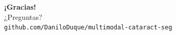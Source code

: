 \documentclass[aspectratio=169]{beamer}
\begin{document}
\begin{frame}{}
\centering
\vspace{2em}
{\LARGE \textbf{¡Gracias!}}\\[1.5em]
{\large ¿Preguntas?}\\[2em]
\texttt{github.com/DaniloDuque/multimodal-cataract-seg}
\end{frame}
\end{document}
